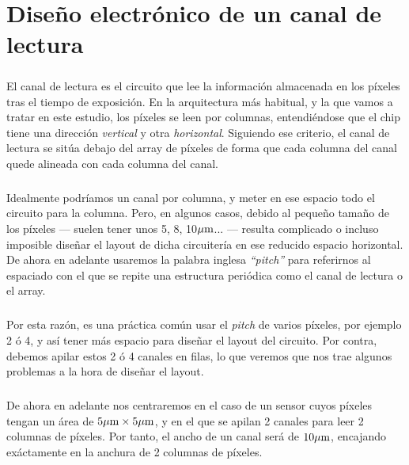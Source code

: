 \chapter{Diseño electrónico de un canal de lectura}\label{cap:ro_sch}

\paragraph{}
El canal de lectura es el circuito que lee la información almacenada en los píxeles
tras el tiempo de exposición.
En la arquitectura más habitual, y la que vamos a tratar en este estudio, los
píxeles se leen por columnas, entendiéndose que el chip tiene una dirección
\textit{vertical} y otra \textit{horizontal}. Siguiendo ese criterio, el canal de lectura se
sitúa debajo del array de píxeles de forma que cada columna del canal quede alineada
con cada columna del canal.

\paragraph{}
Idealmente podríamos un canal por columna, y meter en ese espacio todo el circuito
para la columna. Pero, en algunos casos, debido al pequeño tamaño de los píxeles
--- suelen tener unos 5, 8, 10$\mu\text{m}$... --- resulta complicado o incluso imposible diseñar el
layout de dicha circuitería en ese reducido espacio horizontal. De ahora en adelante
usaremos la palabra inglesa \textit{``pitch''} para referirnos al espaciado con el
que se repite una estructura periódica como el canal de lectura o el array.

\paragraph{}
Por esta razón, es una práctica común usar el \textit{pitch} de varios píxeles, por
ejemplo 2 ó 4, y así tener más espacio para diseñar el layout del circuito. Por contra,
debemos apilar estos 2 ó 4 canales en filas, lo que veremos que nos trae algunos
problemas a la hora de diseñar el layout.

\paragraph{}
De ahora en adelante nos centraremos en el caso de un sensor cuyos píxeles tengan
un área de $5\mu\text{m} \times 5\mu\text{m}$, y en el que se apilan 2 canales para leer 2
columnas de píxeles. Por tanto, el ancho de un canal será de $10\mu\text{m}$, encajando
exáctamente en la anchura de 2 columnas de píxeles.


